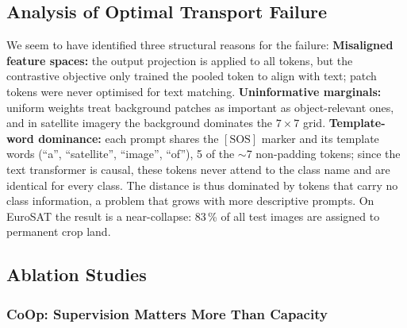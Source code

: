 \documentclass[10pt,twocolumn,letterpaper]{article}
\begin{document}
\subsection{Analysis of Optimal Transport Failure}\label{sec:ot-analysis}

We seem to have identified three structural reasons for the failure:
\textbf{Misaligned feature spaces:} the output projection is applied to
all tokens, but the contrastive objective only trained the pooled token to
align with text; patch tokens were never optimised for text matching.
\textbf{Uninformative marginals:} uniform weights treat background patches
as important as object-relevant ones, and in satellite imagery the
background dominates the $7 \times 7$ grid.
\textbf{Template-word dominance:} each prompt shares the $[\mathrm{SOS}]$
marker and its template words (``a'', ``satellite'', ``image'', ``of''),
5 of the $\sim$7 non-padding tokens; since the text transformer is causal,
these tokens never attend to the class name and are identical for every
class.  The distance is thus dominated by tokens that carry no class
information, a problem that grows with more descriptive prompts.  On
EuroSAT the result is a near-collapse: 83\,\% of all test images are
assigned to permanent crop land.

\subsection{Ablation Studies}\label{sec:ablations}

\subsubsection{CoOp: Supervision Matters More Than Capacity}\label{sec:coop-ablation}
\end{document}
